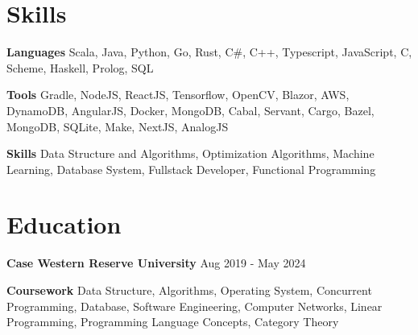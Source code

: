 \documentclass[11pt]{article}
\begin{document}
\section{Skills}
    \hspace{10pt}\textbf{Languages} {\small Scala, Java, Python, Go, Rust, C\#, C++, Typescript, JavaScript, C, Scheme, Haskell, Prolog, SQL}

    \hspace{10pt}\textbf{Tools} {\small Gradle, NodeJS, ReactJS, Tensorflow, OpenCV, Blazor, AWS, DynamoDB, AngularJS, Docker, MongoDB, Cabal, Servant, Cargo, Bazel, MongoDB, SQLite, Make, NextJS, AnalogJS}

    \hspace{10pt}\textbf{Skills} {\small Data Structure and Algorithms, Optimization Algorithms, Machine Learning, Database System, Fullstack Developer, Functional Programming}
    \vspace{-10pt}
      
\section{Education}
    \hspace{10pt}\textbf{Case Western Reserve University} \hfill {\small Aug 2019 - May 2024}\\

    \hspace{10pt}\textbf{Coursework} {\small Data Structure, Algorithms, Operating System, Concurrent Programming, Database, Software Engineering, Computer Networks, Linear Programming, Programming Language Concepts, Category Theory}
\end{document}

